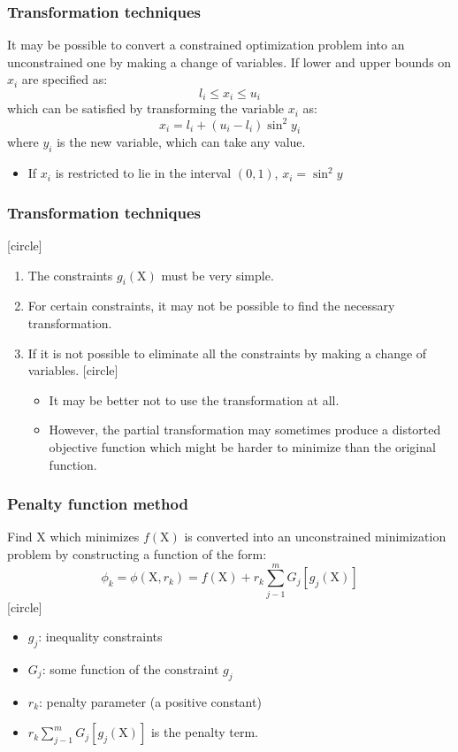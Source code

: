 \documentclass{beamer}
\begin{document}
\begin{frame}
    \frametitle{Transformation techniques}
    It may be possible to convert a constrained optimization problem into an unconstrained one
    by making a change of variables.
    \hfill \break
    If lower and upper bounds on $x_i$ are specified as:
    $$l_i\leq x_i\leq u_i$$
    which can be satisfied by transforming the variable $x_i$ as:
    $$x_i=l_i+(u_i-l_i)\sin^2y_i$$
    where $y_i$ is the new variable, which can take any value.
    \begin{itemize}
    \item If $x_i$ is restricted to lie in the interval $(0, 1)$, $x_i=\sin^2y$
    \end{itemize}
\end{frame}
\begin{frame}
    \frametitle{Transformation techniques}
    [circle]
    \begin{enumerate}
        \item The constraints $g_i(\textrm{X})$ must be very simple.
        \item For certain constraints, it may not be possible to find the necessary transformation.
        \item If it is not possible to eliminate all the constraints by making a change of
        variables.
        [circle]
        \begin{itemize}
            \item It may be better not to use the transformation at all.
            \item However, the partial transformation may sometimes produce a distorted objective function which might
            be harder to minimize than the original function.
        \end{itemize}
    \end{enumerate}
\end{frame}

\begin{frame}
    \frametitle{Penalty function method}
    Find $\textrm{X}$ which minimizes $f(\textrm{X})$ is converted into
    an unconstrained minimization problem by constructing a function of the form:
    $$\phi_k=\phi(\textrm{X}, r_k)=f(\textrm{X})+r_k\sum^m_{j-1}G_j[g_j(\textrm{X})]$$
    [circle]
    \begin{itemize}
        \item $g_j$: inequality constraints
        \item $G_j$: some function of the constraint $g_j$
        \item $r_k$: penalty parameter (a positive constant)
        \item $r_k\sum^m_{j-1}G_j[g_j(\textrm{X})]$ is the penalty term.
    \end{itemize}
\end{frame}
\end{document}
